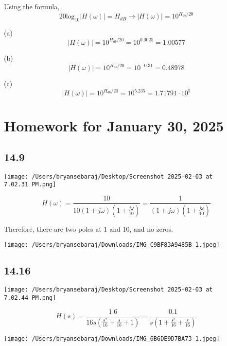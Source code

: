 \documentclass{article}
\begin{document}
Using the formula, $$20 \text{log}_{10}|H(\omega)| = H_{dB} \rightarrow |H(\omega)| = 10^{H_{db} / 20}$$

(a) $$|H(\omega)| = 10^{H_{db} / 20} = 10^{0.0025}=1.00577$$

(b) $$|H(\omega)| = 10^{H_{db} / 20} = 10^{-0.31}=0.48978$$

(c) $$|H(\omega)| = 10^{H_{db} / 20} = 10^{5.235}=1.71791 \cdot 10^5$$


\section*{Homework for January 30, 2025}

\subsection*{14.9}
\texttt{[image: /Users/bryansebaraj/Desktop/Screenshot 2025-02-03 at 7.02.31 PM.png]}

$$H(\omega)=\frac{10}{10(1 + j\omega)(1 + \frac{j\omega}{10})}=\frac{1}{(1 + j\omega)(1 + \frac{j\omega}{10})}$$

Therefore, there are two poles at 1 and 10, and no zeros.



\texttt{[image: /Users/bryansebaraj/Downloads/IMG\_C9BF83A9485B-1.jpeg]}

\subsection*{14.16}
\texttt{[image: /Users/bryansebaraj/Desktop/Screenshot 2025-02-03 at 7.02.44 PM.png]}

$$H(s)=\frac{1.6}{16s(\frac{s^2}{16}+\frac{s}{16} + 1)}=\frac{0.1}{s(1+\frac{s^2}{16}+\frac{s}{16})}$$

\texttt{[image: /Users/bryansebaraj/Downloads/IMG\_6B6DE9D7BA73-1.jpeg]}
\end{document}

